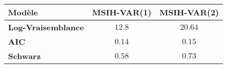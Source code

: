 \begin{tabular}{lcc}
\toprule
\textbf{Modèle} & \textbf{MSIH-VAR(1)} & \textbf{MSIH-VAR(2)} \\
\midrule
\textbf{Log-Vraisemblance} & $12.8$ & $20.64$ \\
\textbf{AIC} & $0.14$ & $0.15$ \\
\textbf{Schwarz} & $0.58$ & $0.73$ \\
\bottomrule
\end{tabular}

